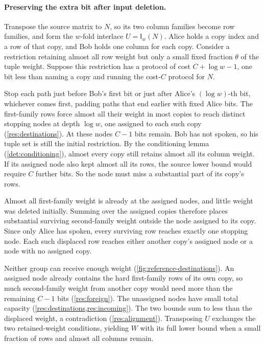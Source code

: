 \documentclass[11pt,letterpaper]{article} \usepackage[utf8]{inputenc}
\theoremstyle{plain} \newtheorem{theorem}{Theorem}[section]
\theoremstyle{definition} \newaliascnt{definition}{theorem}
\newcommand{\Int}[2]{\mathsf{I}_{#1}(#2)}
\begin{document}
\paragraph{Preserving the extra bit after input deletion.}
Transpose the source matrix to $N$, so its two column families become
row families, and form the $w$-fold interlace $U=\Int{w}{N}$. Alice
holds a copy index and a row of that copy, and Bob holds one column for
each copy. Consider a restriction retaining almost all row weight but
only a small fixed fraction $\theta$ of the tuple weight. Suppose this
restriction has a protocol of cost $C+\log w-1$, one bit less than
naming a copy and running the cost-$C$ protocol for $N$.

Stop each path just before Bob's first bit or just after Alice's
$(\log w)$-th bit, whichever comes first, padding paths that end
earlier with fixed Alice bits.
The first-family rows force almost all their weight in most copies to
reach distinct stopping nodes at depth $\log w$, one assigned to each
such copy (\cref{res:destinations}). At these nodes $C-1$ bits remain.
Bob has not spoken, so his tuple set is still the initial restriction.
By the conditioning lemma (\cref{det:conditioning}), almost every
copy still retains almost all its column weight. If its assigned node
also kept almost all its rows, the source lower bound would require
$C$ further bits. So the node must miss a substantial part of its
copy's rows.

Almost all first-family weight is already at the assigned nodes, and
little weight was deleted initially. Summing over the assigned copies
therefore places substantial surviving second-family weight outside
the node assigned to its copy. Since only Alice has spoken, every
surviving row reaches exactly one stopping node. Each such displaced
row reaches either another copy's assigned node or a node with no
assigned copy.

Neither group can receive enough weight
(\cref{fig:reference-destinations}). An assigned node already contains
the hard first-family rows of its own copy, so much second-family
weight from another copy would need more than the remaining $C-1$ bits
(\cref{res:foreign}). The unassigned nodes have small total capacity
(\cref{res:destinations,res:incoming}). The two bounds sum to less than the displaced
weight, a contradiction (\cref{res:alignment}). Transposing $U$ exchanges
the two retained-weight conditions, yielding $W$ with its full lower
bound when a small fraction of rows and almost all columns remain.
\end{document}
